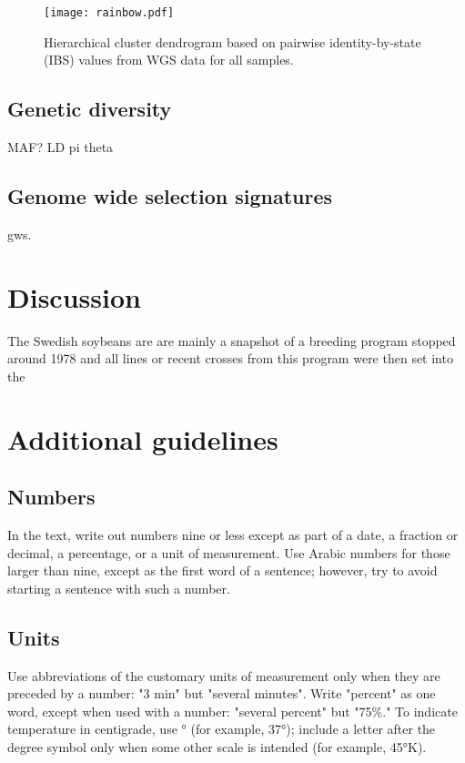 \documentclass[9pt,twocolumn,twoside,lineno]{gsajnl}
\begin{document}
\begin{figure}[t]
\centering
\texttt{[image: rainbow.pdf]}
\caption{Hierarchical cluster dendrogram based on pairwise identity-by-state (IBS) values from WGS data for all samples. }%
\label{fig:dendo}
\end{figure}

\subsection{Genetic diversity} 

MAF?
LD
pi 
theta


\subsection{Genome wide selection signatures} 
gws.



\section{Discussion}

The Swedish soybeans are are mainly a snapshot of a breeding program stopped around 1978 and all lines or recent crosses from this program were then set into the  



\section{Additional guidelines}

\subsection{Numbers} In the text, write out numbers nine or less except as part of a date, a fraction or decimal, a percentage, or a unit of measurement. Use Arabic numbers for those larger than nine, except as the first word of a sentence; however, try to avoid starting a sentence with such a number.

\subsection{Units} Use abbreviations of the customary units of measurement only when they are preceded by a number: "3 min" but "several minutes". Write "percent" as one word, except when used with a number: "several percent" but "75\%." To indicate temperature in centigrade, use ° (for example, 37°); include a letter after the degree symbol only when some other scale is intended (for example, 45°K).
\end{document}
